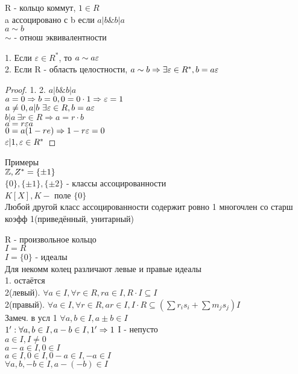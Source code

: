 R - кольцо коммут, $ 1 \in R $ \\
a ассоцировано с b если $ a | b \& b | a $ \\
$ a \sim b $\\
$ \sim $ - отнош эквивалентности \\
\begin{theorem}
	1. Если $ \varepsilon \in R^* $, то $ a \sim a\varepsilon $\\
	2. Если R - область целостности, $ a \sim b \Rightarrow \exists \varepsilon \in R^*, b = a\varepsilon $
	\begin{proof}
		1. %
		2. $ a | b \& b | a $ \\
		$ a = 0 \Rightarrow b = 0, 0 = 0 \cdot 1 \Rightarrow \varepsilon = 1	$ \\
		$ a \neq 0, a | b \ \exists \varepsilon \in R, b = a\varepsilon $ \\
		$ b | a \ \exists r \in R \Rightarrow a = r \cdot b $ \\
		$ a = r \varepsilon a  $ \\
		$ 0 = a (1 - re) \Rightarrow 1 - r \varepsilon = 0 $ \\
		$ \varepsilon | 1, \varepsilon \in R^* $
	\end{proof}
\end{theorem}
Примеры \\
$ \mathbb{Z}, Z^* = \{\pm 1 \}$ \\
$ \{0\}, \{\pm 1\}, \{ \pm 2 \} $ - классы ассоцированности \\
$ K[X], K - $ поле $ \{0\} $ \\
Любой другой класс ассоцированности содержит ровно 1 многочлен со старш коэфф 1(приведённый, унитарный) \\


R - произвольное кольцо\\ %
$I = R$ \\
$ I = \{0\} $ - идеалы \\ 
Для некомм колец различают левые и правые идеалы \\
1. остаётся \\
2(левый). $ \forall a \in I, \forall r \in R, ra \in I, R\cdot I \subseteq I $ \\ 2(правый). $ \forall a \in I, \forall r \in R, ar \in I,  I \cdot R \subseteq  (\sum r_is_i + \sum m_js_j)I $ \\

Замеч. в усл 1 $ \forall a,b \in I, a \pm b \in I $\\
$ 1' : \forall a,b \in I, a-b \in I , \\
1' \Rightarrow 1 $ I - непусто \\
$ a \in I, I \neq 0 $ \\
$ a - a \in I, 0 \in I $\\
$ a \in I, 0 \in  I, 0 - a \in I, -a \in I $\\
$ \forall a,b, -b \in I, a - (-b) \in I $\\

